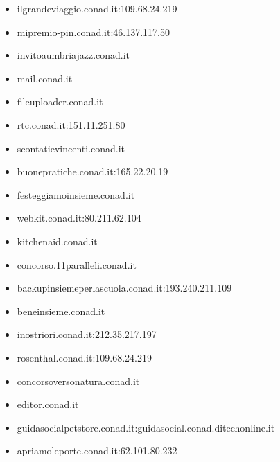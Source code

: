 \documentclass{article}
\begin{document}
\begin{itemize}
        \item ilgrandeviaggio.conad.it:109.68.24.219
    
        \item mipremio-pin.conad.it:46.137.117.50
    
        \item invitoaumbriajazz.conad.it
    
        \item mail.conad.it
    
        \item fileuploader.conad.it
    
        \item rtc.conad.it:151.11.251.80
    
        \item scontatievincenti.conad.it
    
        \item buonepratiche.conad.it:165.22.20.19
    
        \item festeggiamoinsieme.conad.it
    
        \item webkit.conad.it:80.211.62.104
    
        \item kitchenaid.conad.it
    
        \item concorso.11paralleli.conad.it
    
        \item backupinsiemeperlascuola.conad.it:193.240.211.109
    
        \item beneinsieme.conad.it
    
        \item inostriori.conad.it:212.35.217.197
    
        \item rosenthal.conad.it:109.68.24.219
    
        \item concorsoversonatura.conad.it
    
        \item editor.conad.it
    
        \item guidasocialpetstore.conad.it:guidasocial.conad.ditechonline.it
    
        \item apriamoleporte.conad.it:62.101.80.232
    

\end{itemize}
\end{document}
